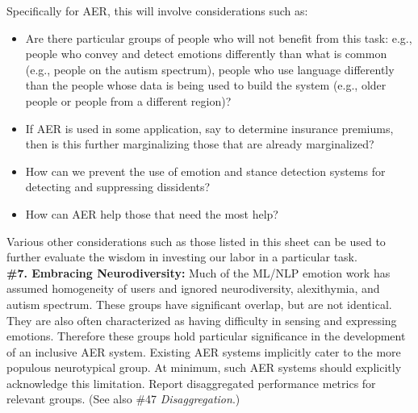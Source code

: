 \documentclass{clv3}
\begin{document}
\noindent Specifically for AER, this will involve considerations such as:\\[-20pt]
\begin{itemize}
    \item Are there particular groups of people who will not benefit from this task: e.g., people who convey and detect emotions differently than what is common (e.g., people on the autism spectrum), people who use language differently than the people whose data is being used to build the system (e.g., older people or people from a different region)?
    \item If AER is used in some application, say to determine insurance premiums, then is this further marginalizing those that are already marginalized?
    \item How can we prevent the use of emotion and stance detection systems for detecting and suppressing dissidents?
    \item How can AER help those that need the most help?
    \vspace*{-3mm}
\end{itemize}
\noindent Various other considerations such as those listed in this sheet can be used to further evaluate the wisdom in investing our labor in a particular task.\\

\noindent \textbf{\#7. Embracing Neurodiversity:} Much of the ML/NLP emotion work has assumed homogeneity of users and ignored neurodiversity, alexithymia, and autism spectrum. %
These groups have significant overlap, but are not identical. They are also often characterized as having difficulty in sensing and expressing emotions. Therefore these groups hold particular significance in the development of an inclusive AER system. Existing AER systems implicitly cater to the more populous neurotypical group. At minimum, such AER systems should explicitly acknowledge this limitation. Report disaggregated performance metrics for relevant groups. (See also \#47 \textit{Disaggregation}.)
\end{document}
